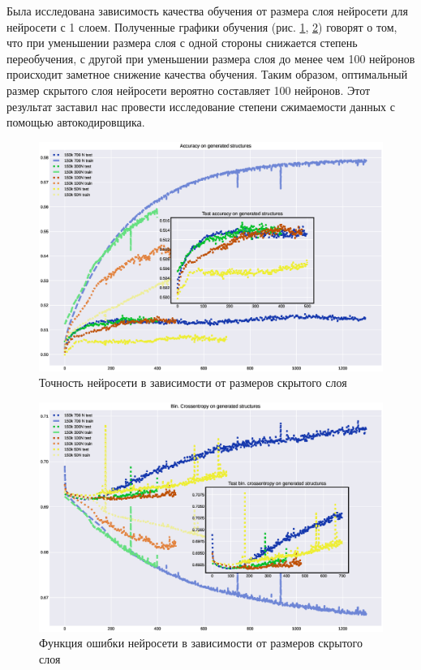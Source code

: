 \documentclass{article}
\begin{document}
Была исследована зависимость качества обучения от размера слоя нейросети для нейросети с 1 слоем. Полученные графики обучения (рис. \ref{fig:acc_lsize}, \ref{fig:loss_lsize}) говорят о том, что при уменьшении размера слоя с одной стороны снижается степень переобучения, с другой при уменьшении размера слоя до менее чем 100 нейронов происходит заметное снижение качества обучения. Таким образом, оптимальный размер скрытого слоя нейросети вероятно составляет 100 нейронов. Этот результат заставил нас провести исследование степени сжимаемости данных с помощью автокодировщика.

\begin{figure}[!htp]
\includegraphics[width=\linewidth]{imgs/acc-lsize.eps}
  \caption{Точность нейросети в зависимости от размеров скрытого слоя}\label{fig:acc_lsize}
\end{figure}
\begin{figure}[!htp]
\includegraphics[width=\linewidth]{imgs/loss-lsize.eps}
  \caption{Функция ошибки нейросети в зависимости от размеров скрытого слоя}\label{fig:loss_lsize}
\end{figure}
\end{document}
